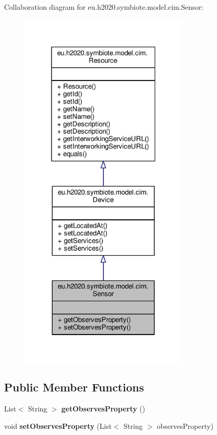 Collaboration diagram for eu.\+h2020.\+symbiote.\+model.\+cim.\+Sensor\+:\nopagebreak
\begin{figure}[H]
\begin{center}
\leavevmode
\includegraphics[width=232pt]{classeu_1_1h2020_1_1symbiote_1_1model_1_1cim_1_1Sensor__coll__graph}
\end{center}
\end{figure}
\subsection*{Public Member Functions}
\begin{DoxyCompactItemize}
\item 
\mbox{\label{classeu_1_1h2020_1_1symbiote_1_1model_1_1cim_1_1Sensor_aba93257ef63a8a0ba5be3557532b4c02}} 
List$<$ String $>$ {\bfseries get\+Observes\+Property} ()
\item 
\mbox{\label{classeu_1_1h2020_1_1symbiote_1_1model_1_1cim_1_1Sensor_a1f7116596d4ca0c0e65e79c3f4e1bfc8}} 
void {\bfseries set\+Observes\+Property} (List$<$ String $>$ observes\+Property)
\end{DoxyCompactItemize}


